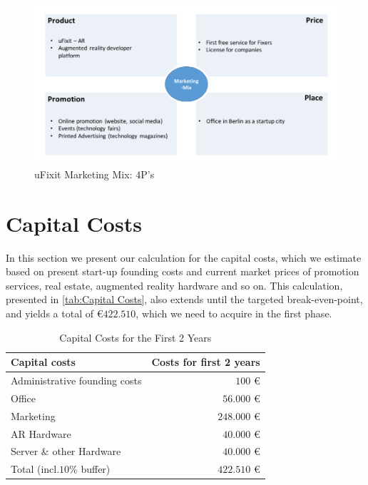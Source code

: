 \begin{figure}[H]
		\includegraphics[width=\textwidth]{../images/MarketingStrategy.png}
		\centering
		\caption[uFixit Marketing Mix: $4$P's]{uFixit Marketing Mix: $4$P's}
		\label{fig:Marketing}
\end{figure}


\section{Capital Costs}
In this section we present our calculation for the capital costs, which we estimate based on present start-up founding costs and current market prices of promotion services, real estate, augmented reality hardware and so on. This calculation, presented in \autoref{tab:Capital Costs}, also extends until the targeted break-even-point, and yields a total of \euro $422.510$, which we need to acquire in the first phase.

\begin{table}[H]
\caption[Capital Costs for the First 2 Years]{Capital Costs for the First 2 Years}
\label{tab:Capital Costs}
\begin{center}
\begin{tabular}{|l|r|}
\hline 
Capital costs & Costs for first 2 years \\ 
\hline 
Administrative founding costs & $100$ \euro \\ 
\hline 
Office & $56.000$ \euro \\ 
\hline 
Marketing & $248.000$ \euro \\ 
\hline 
AR Hardware & $40.000$ \euro \\ 
\hline 
Server \& other Hardware & $40.000$ \euro \\ 
\hline 
Total (incl.$10\%$ buffer) & $422.510$ \euro \\ 
\hline 
\end{tabular} 
\end{center}
\end{table}